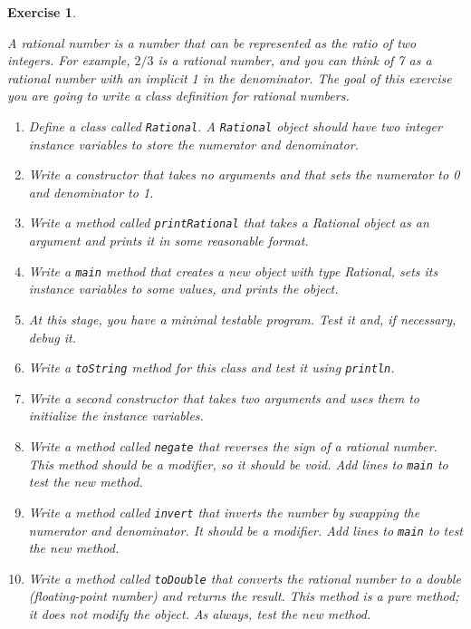\documentclass[12pt]{book}
\theoremstyle{exercise}
\newtheorem{exercise}{Exercise}[chapter]
\newcommand{\java}[1]{\verb"#1"}
\newcommand{\java}[1]{\lstinline{#1}} %
\begin{document}
\begin{exercise}
\label{ex.rational}


A rational number is a number that can be represented as the ratio of two integers.
For example, $2/3$ is a rational number, and you can think of 7 as a rational number with an implicit 1 in the denominator.
The goal of this exercise you are going to write a class definition for rational numbers.

\begin{enumerate}

\item Define a class called \java{Rational}.
A \java{Rational} object should have two integer instance variables to store the numerator and denominator.

\item Write a constructor that takes no arguments and that sets the numerator to 0 and denominator to 1.

\item Write a method called \java{printRational} that takes a Rational object as an argument and prints it in some reasonable format.

\item Write a \java{main} method that creates a new object with type Rational, sets its instance variables to some values, and prints the object.

\item At this stage, you have a minimal testable program.
Test it and, if necessary, debug it.

\item Write a \java{toString} method for this class and test it using \java{println}.

\item Write a second constructor that takes two arguments and uses them to initialize the instance variables.

\item Write a method called \java{negate} that reverses the sign of a rational number.
This method should be a modifier, so it should be void.
Add lines to \java{main} to test the new method.

\item Write a method called \java{invert} that inverts the number by swapping the numerator and denominator.
It should be a modifier.
Add lines to \java{main} to test the new method.

\item Write a method called \java{toDouble} that converts the rational number to a double (floating-point number) and returns the result.
This method is a pure method; it does not modify the object.
As always, test the new method.


\end{enumerate}
\end{exercise}
\end{document}
